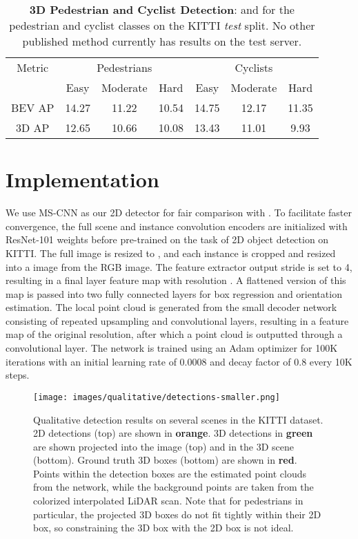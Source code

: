 \documentclass[10pt,twocolumn,letterpaper]{article}
\begin{document}
	\begin{table*}[t!]
		\small
		\centering
		\begin{tabular}{|c||ccc||ccc|}
			\hline
			Metric & \multicolumn{3}{c||}{Pedestrians} & \multicolumn{3}{c|}{Cyclists} \\
			\cline{2-7} & Easy & Moderate & Hard & Easy & Moderate & Hard \\
			\hline
			BEV AP    & 14.27 & 11.22 & 10.54 & 14.75 & 12.17 & 11.35 \\ \hline
			3D AP     & 12.65 & 10.66 & 10.08 & 13.43 & 11.01 &  9.93 \\ \hline
		\end{tabular}
		\caption{\textbf{3D Pedestrian and Cyclist Detection}: \emph{} and \emph{} for the pedestrian and cyclist classes on the KITTI \emph{test} split. No other published method currently has results on the test server.}
		\label{tab:kitti_test_ped_cyc}
	\end{table*}
	
	\section{Implementation}
	We use MS-CNN \cite{cai} as our 2D detector for fair comparison with \cite{mousavian_deep3dbox}. To facilitate faster convergence, the full scene and instance convolution encoders are initialized with ResNet-101 weights before  pre-trained on the task of 2D object detection on KITTI. The full image is resized to , and each instance is cropped and resized into a  image from the RGB image. The feature extractor output stride is set to 4, resulting in a final layer feature map with resolution . A flattened version of this map is passed into two fully connected layers for box regression and orientation estimation. The local point cloud is generated from the small decoder network consisting of repeated upsampling and convolutional layers, resulting in a feature map of the original  resolution, after which a  point cloud  is outputted through a  convolutional layer. The network is trained using an Adam optimizer for 100K iterations with an initial learning rate of 0.0008 and decay factor of 0.8 every 10K steps.
	
	\begin{figure*}[t]
		\begin{center}
			\texttt{[image: images/qualitative/detections-smaller.png]}
		\end{center}
		\caption{Qualitative detection results on several scenes in the KITTI dataset. 2D detections (top) are shown in \textbf{orange}. 3D detections in \textbf{green} are shown projected into the image (top) and in the 3D scene (bottom). Ground truth 3D boxes (bottom) are shown in \textbf{red}. Points within the detection boxes are the estimated point clouds from the network, while the background points are taken from the colorized interpolated LiDAR scan. Note that for pedestrians in particular, the projected 3D boxes do not fit tightly within their 2D box, so constraining the 3D box with the 2D box is not ideal.}
		\label{fig:qual_results}
\end{figure*}
	
\end{document}
